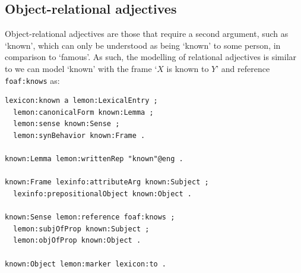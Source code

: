 \documentclass[11pt]{article}
\begin{document}

\subsection{Object-relational adjectives}

Object-relational adjectives are those that require a second argument, such as `known', which
can only be understood as being `known' to some person, in comparison to `famous'.
As such, the modelling of relational adjectives is similar to we can model `known' with the frame `$X$ is known to $Y$' and
reference {\tt foaf:knows} as:
 
\begin{small}\begin{verbatim}
lexicon:known a lemon:LexicalEntry ;
  lemon:canonicalForm known:Lemma ;
  lemon:sense known:Sense ;
  lemon:synBehavior known:Frame .

known:Lemma lemon:writtenRep "known"@eng .

known:Frame lexinfo:attributeArg known:Subject ;
  lexinfo:prepositionalObject known:Object .

known:Sense lemon:reference foaf:knows ;
  lemon:subjOfProp known:Subject ;
  lemon:objOfProp known:Object .
	
known:Object lemon:marker lexicon:to .
\end{verbatim}\end{small}

%
%
%
\end{document}
